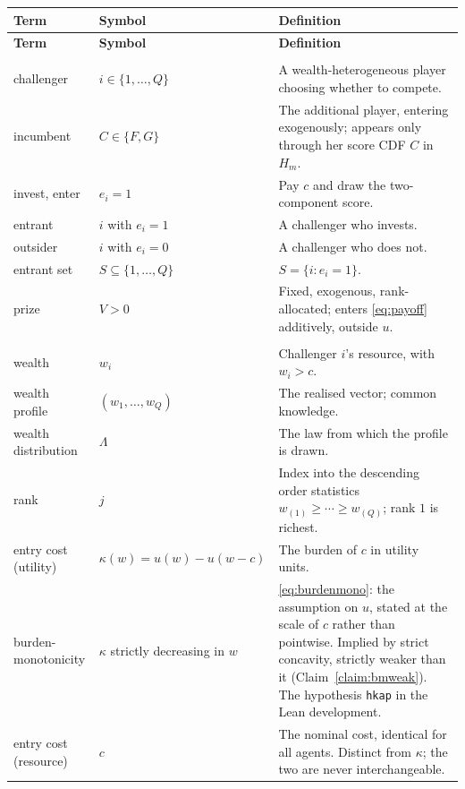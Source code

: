 \documentclass[11pt]{article}
\begin{document}
\begin{longtable}{@{}>{\raggedright\arraybackslash}p{}>{\raggedright\arraybackslash}p{}>{\raggedright\arraybackslash}p{}@{}}
\toprule
\textbf{Term} & \textbf{Symbol} & \textbf{Definition} \\
\midrule
\endfirsthead
\toprule
\textbf{Term} & \textbf{Symbol} & \textbf{Definition} \\
\midrule
\endhead
\multicolumn{3}{@{}l}{\emph{Players and actions}}\\[2pt]
challenger & $i\in\{1,\dots,Q\}$ & A wealth-heterogeneous player choosing
  whether to compete. \\
incumbent & $C\in\{F,G\}$ & The additional player, entering exogenously;
  appears only through her score CDF $C$ in $H_m$. \\
invest, enter & $e_i=1$ & Pay $c$ and draw the two-component score. \\
entrant & $i$ with $e_i=1$ & A challenger who invests. \\
outsider & $i$ with $e_i=0$ & A challenger who does not. \\
entrant set & $S\subseteq\{1,\dots,Q\}$ & $S=\{i:e_i=1\}$. \\
prize & $V>0$ & Fixed, exogenous, rank-allocated; enters
  \eqref{eq:payoff} additively, outside $u$. \\[4pt]
\multicolumn{3}{@{}l}{\emph{Wealth and cost}}\\[2pt]
wealth & $w_i$ & Challenger $i$'s resource, with $w_i>c$. \\
wealth profile & $(w_1,\dots,w_Q)$ & The realised vector; common knowledge. \\
wealth distribution & $\Lambda$ & The law from which the profile is drawn. \\
rank & $j$ & Index into the descending order statistics
  $w_{(1)}\ge\cdots\ge w_{(Q)}$; rank $1$ is richest. \\
entry cost (utility) & $\kappa(w)=u(w)-u(w-c)$ & The burden of $c$ in
  utility units. \\
burden-monotonicity & $\kappa$ strictly decreasing in $w$ & \eqref{eq:burdenmono}:
  the assumption on $u$, stated at the scale of $c$ rather than pointwise.
  Implied by strict concavity, strictly weaker than it
  (Claim~\ref{claim:bmweak}). The hypothesis \texttt{hkap} in the Lean
  development. \\
entry cost (resource) & $c$ & The nominal cost, identical for all agents.
  Distinct from $\kappa$; the two are never interchangeable. \\

\end{longtable}
\end{document}
